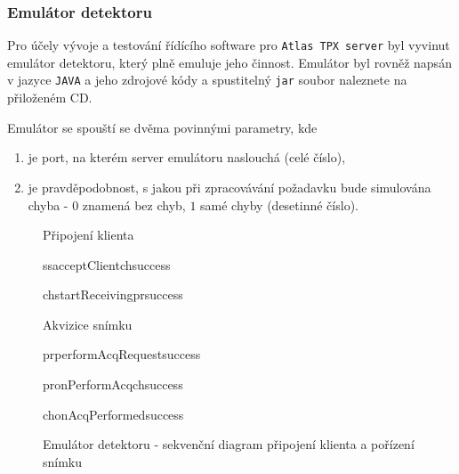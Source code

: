 \subsubsection{Emulátor detektoru}
Pro účely vývoje a testování řídícího software pro \texttt{Atlas TPX server} byl vyvinut emulátor detektoru, který plně emuluje jeho činnost. Emulátor byl rovněž napsán v jazyce \texttt{JAVA} a jeho zdrojové kódy a spustitelný \texttt{jar} soubor naleznete na přiloženém CD.

Emulátor se spouští se dvěma povinnými parametry, kde
\begin{enumerate}
	\item je port, na kterém server emulátoru naslouchá (celé číslo),
	\item je pravděpodobnost, s jakou při zpracovávání požadavku bude simulována chyba - $0$ znamená bez chyb, $1$ samé chyby (desetinné číslo).
\end{enumerate}

\begin{figure}[t]
	\begin{center}
		\begin{sequencediagram}
			\begin{sdblock}{Připojení klienta}{}
				\begin{call}{ss}{acceptClient}{ch}{success}
					\begin{call}{ch}{startReceiving}{pr}{success}
					\end{call}
				\end{call}
			\end{sdblock}
			\begin{sdblock}{Akvizice snímku}{}
				\begin{callself}{pr}{performAcqRequest}{success}
					\begin{call}{pr}{onPerformAcq}{ch}{success}
					\end{call}	
				\end{callself}	
				\postlevel
				\begin{callself}{ch}{onAcqPerformed}{success}
				\end{callself}	
			\end{sdblock}			
		\end{sequencediagram}
		\caption{Emulátor detektoru - sekvenční diagram připojení klienta a pořízení snímku}
		\label{fig:uml:emulator}
	\end{center}
\end{figure}

